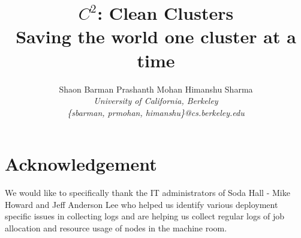 \documentclass[times,10pt,twocolumn]{article}
\date{}
\begin{document}
\title{$C^2$: Clean Clusters\\{\small Saving the world one cluster at a time}}
\author{Shaon Barman \quad Prashanth Mohan \quad Himanshu Sharma \\
\itshape
  University of California, Berkeley\\
\fontsize{9}{9}\selectfont\ttfamily\upshape
\{sbarman, prmohan, himanshu\}@cs.berkeley.edu
}

\maketitle






% 



\section*{Acknowledgement}
We would like to specifically thank the IT administrators of Soda Hall - Mike Howard and Jeff Anderson Lee who helped us identify various deployment specific issues in collecting logs and are helping us collect regular logs of job allocation and resource usage of nodes in the machine room.

\begin{scriptsize}


\end{scriptsize}
\end{document}

